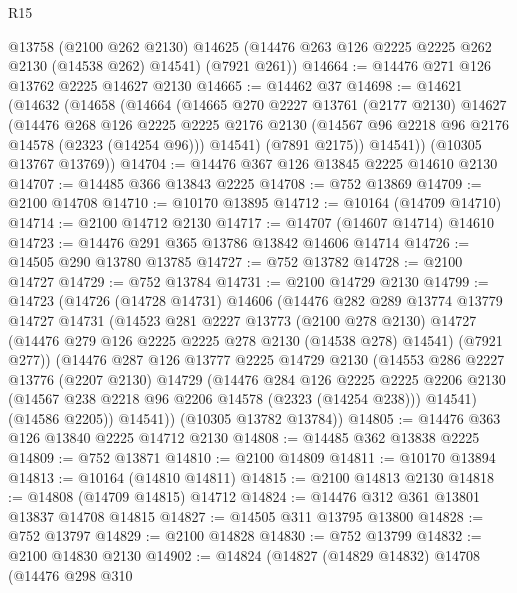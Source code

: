 \begin{lexlean}{R15}
\begin{coremodule}
      @13758
      (@2100 @262 @2130)
      @14625
      (@14476 @263 @126 @2225 @2225 @262 @2130 (@14538 @262) @14541)
      (@7921 @261))
@14664 := @14476 @271 @126 @13762 @2225 @14627 @2130
@14665 := @14462 @37
@14698 := @14621
    (@14632
      (@14658
        (@14664
          (@14665
            @270
            @2227
            @13761
            (@2177 @2130)
            @14627
            (@14476
              @268
              @126
              @2225
              @2225
              @2176
              @2130
              (@14567 @96 @2218 @96 @2176 @14578 (@2323 (@14254 @96)))
              @14541)
            (@7891 @2175))
          @14541))
      (@10305 @13767 @13769))
@14704 := @14476 @367 @126 @13845 @2225 @14610 @2130
@14707 := @14485 @366 @13843 @2225
@14708 := @752 @13869
@14709 := @2100 @14708
@14710 := @10170 @13895
@14712 := @10164 (@14709 @14710)
@14714 := @2100 @14712 @2130
@14717 := @14707 (@14607 @14714) @14610
@14723 := @14476 @291 @365 @13786 @13842 @14606 @14714
@14726 := @14505 @290 @13780 @13785
@14727 := @752 @13782
@14728 := @2100 @14727
@14729 := @752 @13784
@14731 := @2100 @14729 @2130
@14799 := @14723
    (@14726
      (@14728 @14731)
      @14606
      (@14476
        @282
        @289
        @13774
        @13779
        @14727
        @14731
        (@14523
          @281
          @2227
          @13773
          (@2100 @278 @2130)
          @14727
          (@14476 @279 @126 @2225 @2225 @278 @2130 (@14538 @278) @14541)
          (@7921 @277))
        (@14476
          @287
          @126
          @13777
          @2225
          @14729
          @2130
          (@14553
            @286
            @2227
            @13776
            (@2207 @2130)
            @14729
            (@14476
              @284
              @126
              @2225
              @2225
              @2206
              @2130
              (@14567 @238 @2218 @96 @2206 @14578 (@2323 (@14254 @238)))
              @14541)
            (@14586 @2205))
          @14541))
      (@10305 @13782 @13784))
@14805 := @14476 @363 @126 @13840 @2225 @14712 @2130
@14808 := @14485 @362 @13838 @2225
@14809 := @752 @13871
@14810 := @2100 @14809
@14811 := @10170 @13894
@14813 := @10164 (@14810 @14811)
@14815 := @2100 @14813 @2130
@14818 := @14808 (@14709 @14815) @14712
@14824 := @14476 @312 @361 @13801 @13837 @14708 @14815
@14827 := @14505 @311 @13795 @13800
@14828 := @752 @13797
@14829 := @2100 @14828
@14830 := @752 @13799
@14832 := @2100 @14830 @2130
@14902 := @14824
    (@14827
      (@14829 @14832)
      @14708
      (@14476
        @298
        @310

\end{coremodule}
\end{lexlean}
